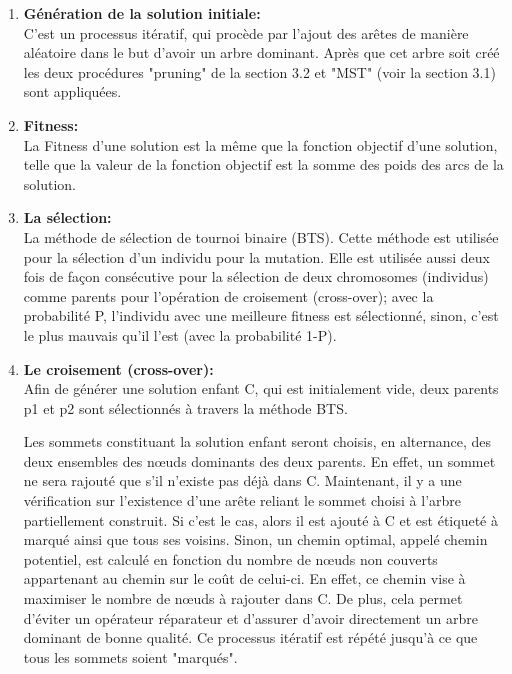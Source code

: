\begin{enumerate}[label=\alph*)]

	\item \textbf{Génération de la solution initiale:}\\
	C’est un processus itératif, qui procède par l’ajout des arêtes de manière aléatoire dans le but d’avoir un arbre dominant. Après que cet arbre soit créé les deux procédures "pruning" de la section 3.2 et "MST" (voir la section 3.1) sont appliquées.
	
	\item \textbf{Fitness: }\\
	La Fitness d’une solution est la même que la fonction objectif d’une solution, telle que la valeur de la fonction objectif est la somme des poids des arcs de la solution.
	
	\item \textbf{La sélection:}\\
    La méthode de sélection de tournoi binaire (BTS). Cette méthode est utilisée pour la sélection d’un individu pour la mutation. Elle est utilisée aussi deux fois de façon consécutive pour la sélection de deux chromosomes (individus) comme parents pour l’opération de croisement (cross-over); avec la probabilité P, l’individu avec une meilleure fitness est sélectionné, sinon, c’est le plus mauvais qu’il l’est (avec la probabilité 1-P).
	     

	\item \textbf{Le croisement (cross-over):}\\
	Afin de générer une solution enfant C, qui est initialement vide, deux parents p1 et p2 sont sélectionnés à travers la méthode BTS.
	
Les sommets constituant la solution enfant seront choisis, en alternance, des deux ensembles des nœuds dominants des deux parents. En effet, un sommet ne sera rajouté que s’il n’existe pas déjà dans C. Maintenant, il y a une vérification sur l’existence d’une arête reliant le sommet choisi à l’arbre partiellement construit. Si c’est le cas, alors il est ajouté à C et est étiqueté à marqué ainsi que tous ses voisins. Sinon, un chemin optimal, appelé chemin potentiel, est calculé en fonction du nombre de nœuds non couverts appartenant au chemin sur le coût de celui-ci. En effet, ce chemin vise à maximiser le nombre de nœuds à rajouter dans C. De plus, cela permet d’éviter un opérateur réparateur et d’assurer d’avoir directement un arbre dominant de bonne qualité. Ce processus itératif est répété jusqu’à ce que tous les sommets soient "marqués".


\end{enumerate}

